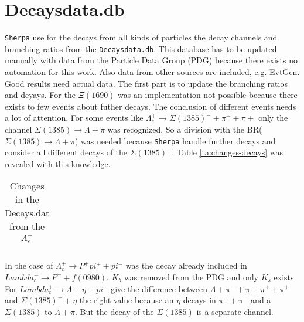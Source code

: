 \section{Decaysdata.db}
\texttt{Sherpa} use for the decays from all kinds of particles the decay channels 
and branching ratios from the \texttt{Decaysdata.db}. This database has to be 
updated manually with data from the Particle Data Group (PDG) because there 
exists no automation for this work. Also data from other sources are included, 
e.g. EvtGen.\\
Good results need actual data. The first part is to update the branching ratios 
and deyays. For the \(\Xi(1690)\) was an implementation not possible because 
there exists to few events about futher decays. The conclusion of different events 
needs a lot of attention. For some events like \(\Lambda_c^+ \rightarrow  
\Sigma(1385)^- + \pi^+ + \pi+\) only the channel \(\Sigma(1385) \rightarrow 
\Lambda + \pi\) was recognized. So a division with the BR(\(\Sigma(1385) 
\rightarrow \Lambda + \pi\)) was needed because \texttt{Sherpa} handle further 
decays and consider all different decays of the \(\Sigma(1385)^-\). Table 
{\eqref{ta:changes-decays}} was revealed with this knowledge.
\begin{longtable}{| c | c | c | c |}
  \caption{Changes in the Decays.dat from the \(\Lambda_c^+\)}\label{ta:changes-decays}\\ 
  \hline
  
\end{longtable}
In the case of \(\Lambda_c^+ \rightarrow P^+ pi^+ + pi^-\) was the decay 
already included in \(Lambda_c^+ \rightarrow P^+ + f(0980)\). \(K_b\) was 
removed from the PDG and only \(K_s\) exists. For \(Lambda_c^+ \rightarrow 
\Lambda + \eta + pi^+\) give the difference between \(\Lambda + \pi^- + 
\pi + \pi^+ + \pi^+\) and  \(\Sigma(1385)^+ + \eta\) the right value because 
an \(\eta\) decays in \(\pi^+ + \pi^-\) and a \(\Sigma(1385)\) to 
\(\Lambda + \pi\). But the decay of the \(\Sigma(1385)\) is a separate channel.

